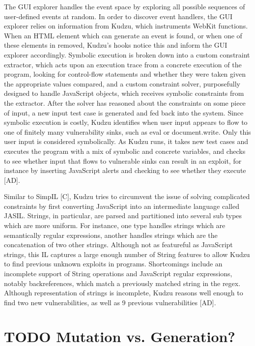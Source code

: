 \documentclass[11pt,expanded,copyright]{fsuthesis}
\begin{document}
The GUI explorer handles the event space by exploring all possible sequences of user-defined events at random. In order to discover event handlers, the GUI explorer relies on information from Kudzu, which instruments WebKit functions. When an HTML element which can generate an event is found, or when one of these elements in removed, Kudzu's hooks notice this and inform the GUI explorer accordingly. Symbolic execution is broken down into a custom constraint extractor, which acts upon an execution trace from a concrete execution of the program, looking for control-flow statements and whether they were taken given the appropriate values compared, and a custom constraint solver, purposefully designed to handle JavaScript objects, which receives symbolic constraints from the extractor. After the solver has reasoned about the constraints on some piece of input, a new input test case is generated and fed back into the system. Since symbolic execution is costly, Kudzu identifies when user input appears to flow to one of finitely many vulnerability sinks, such as eval or document.write. Only this user input is considered symbolically. As Kudzu runs, it takes new test cases and executes the program with a mix of symbolic and concrete variables, and checks to see whether input that flows to vulnerable sinks can result in an exploit, for instance by inserting JavaScript alerts and checking to see whether they execute [AD].

Similar to SimpIL [C], Kudzu tries to circumvent the issue of solving complicated constraints by first converting JavaScript into an intermediate language called JASIL. Strings, in particular, are parsed and partitioned into several sub types which are more uniform. For instance, one type handles strings which are semantically regular expressions, another handles strings which are the concatenation of two other strings. Although not as featureful as JavaScript strings, this IL captures a large enough number of String features to allow Kudzu to find previous unknown exploits in programs. Shortcomings include an incomplete support of String operations and JavaScript regular expressions, notably backreferences, which match a previously matched string in the regex. Although representation of strings is incomplete, Kudzu reasons well enough to find two new vulnerabilities, as well as 9 previous vulnerabilities [AD].

\section{TODO Mutation vs. Generation?}
\end{document}
